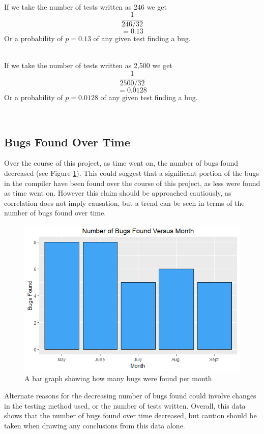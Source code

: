 ~\\
If we take the number of tests written as 246 we get
\[ \dfrac{1}{246 / 32} \]
\[ = 0.13 \]
Or a probability of $p = 0.13$ of any given test finding a bug.

~\\
If we take the number of tests written as 2,500 we get
\[ \dfrac{1}{2500 / 32} \]
\[ = 0.0128 \]
Or a probability of $p = 0.0128$ of any given test finding a bug.

~\\


\subsection{Bugs Found Over Time}

Over the course of this project, as time went on, the number of bugs found decreased (see Figure \ref{graph}). This could suggest that a significant portion of the bugs in the compiler have been found over the course of this project, as less were found as time went on. However this claim should be approached cautiously, as correlation does not imply causation, but a trend can be seen in terms of the number of bugs found over time. 
\begin{figure}[h]
\includegraphics{bugsvsmonth}
\caption{A bar graph showing how many bugs were found per month \label{graph}}
\end{figure}
Alternate reasons for the decreasing number of bugs found could involve changes in the testing method used, or the number of tests written. Overall, this data shows that the number of bugs found over time decreased, but caution should be taken when drawing any conclusions from this data alone.


